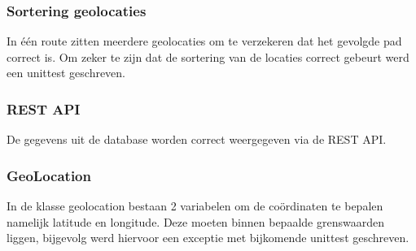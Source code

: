 \documentclass[ps,a4paper,oneside]{report}
\begin{document}
\subsubsection{Sortering geolocaties}
In \'e\'en route zitten meerdere geolocaties om te verzekeren dat het gevolgde pad correct is. Om zeker te zijn dat de sortering van de locaties correct gebeurt werd een unittest geschreven.
\subsubsection{REST API}
De gegevens uit de database worden correct weergegeven via de REST API.
\subsubsection{GeoLocation}
In de klasse geolocation bestaan 2 variabelen om de co\"ordinaten te bepalen namelijk latitude en longitude. Deze moeten binnen bepaalde grenswaarden liggen, bijgevolg werd hiervoor een exceptie met bijkomende unittest geschreven.
\end{document}
